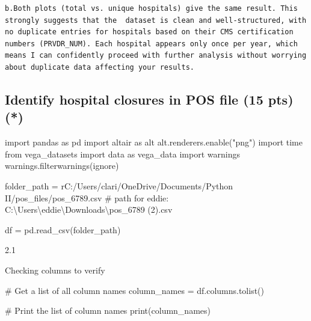 \documentclass[
  letterpaper,
  DIV=11,
  numbers=noendperiod]{scrartcl}
\newenvironment{Shaded}{\begin{snugshade}}{\end{snugshade}}
\newcommand{\BuiltInTok}[1]{\textcolor[rgb]{0.00,0.23,0.31}{#1}}
\newcommand{\CommentTok}[1]{\textcolor[rgb]{0.37,0.37,0.37}{#1}}
\newcommand{\ImportTok}[1]{\textcolor[rgb]{0.00,0.46,0.62}{#1}}
\newcommand{\NormalTok}[1]{\textcolor[rgb]{0.00,0.23,0.31}{#1}}
\newcommand{\OperatorTok}[1]{\textcolor[rgb]{0.37,0.37,0.37}{#1}}
\newcommand{\StringTok}[1]{\textcolor[rgb]{0.13,0.47,0.30}{#1}}
\newcommand{\VerbatimStringTok}[1]{\textcolor[rgb]{0.13,0.47,0.30}{#1}}
\begin{document}
\begin{verbatim}
b.Both plots (total vs. unique hospitals) give the same result. This strongly suggests that the  dataset is clean and well-structured, with no duplicate entries for hospitals based on their CMS certification numbers (PRVDR_NUM). Each hospital appears only once per year, which means I can confidently proceed with further analysis without worrying about duplicate data affecting your results.
\end{verbatim}

\subsection{Identify hospital closures in POS file (15 pts)
(*)}\label{identify-hospital-closures-in-pos-file-15-pts}

\begin{Shaded}
\begin{Highlighting}[]
\ImportTok{import}\NormalTok{ pandas }\ImportTok{as}\NormalTok{ pd}
\ImportTok{import}\NormalTok{ altair }\ImportTok{as}\NormalTok{ alt}
\NormalTok{alt.renderers.enable(}\StringTok{"png"}\NormalTok{)}
\ImportTok{import}\NormalTok{ time}
\ImportTok{from}\NormalTok{ vega\_datasets }\ImportTok{import}\NormalTok{ data }\ImportTok{as}\NormalTok{ vega\_data}
\ImportTok{import}\NormalTok{ warnings }
\NormalTok{warnings.filterwarnings(}\StringTok{\textquotesingle{}ignore\textquotesingle{}}\NormalTok{)}

\NormalTok{folder\_path }\OperatorTok{=} \VerbatimStringTok{r\textquotesingle{}C:/Users/clari/OneDrive/Documents/Python II/pos\_files/pos\_6789.csv\textquotesingle{}}
\CommentTok{\# path for eddie: \textquotesingle{}C:\textbackslash{}Users\textbackslash{}eddie\textbackslash{}Downloads\textbackslash{}pos\_6789 (2).csv\textquotesingle{}}

\NormalTok{df }\OperatorTok{=}\NormalTok{ pd.read\_csv(folder\_path)}
\end{Highlighting}
\end{Shaded}

2.1

Checking columns to verify

\begin{Shaded}
\begin{Highlighting}[]
\CommentTok{\# Get a list of all column names}
\NormalTok{column\_names }\OperatorTok{=}\NormalTok{ df.columns.tolist()}

\CommentTok{\# Print the list of column names}
\BuiltInTok{print}\NormalTok{(column\_names)}
\end{Highlighting}
\end{Shaded}
\end{document}
